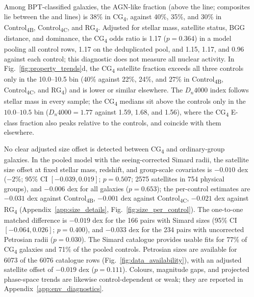\documentclass{aa}
\newcommand{\CB}{Control\textsubscript{4B}}
\newcommand{\CC}{Control\textsubscript{4C}}
\newcommand{\CG}{CG\textsubscript{4}}
\newcommand{\RG}{RG\textsubscript{4}}
\begin{document}
Among BPT-classified galaxies, the AGN-like fraction (above the \citealt{Kewley+01} line; composites lie between the \citealt{Kauffmann+03a} and \citealt{Kewley+01} lines) is 38\% in \CG{}, against 40\%, 35\%, and 30\% in \CB{}, \CC{}, and \RG{}. Adjusted for stellar mass, satellite status, BGG distance, and dominance, the \CG{} odds ratio is 1.17 (\(p = 0.364\)) in a model pooling all control rows, 1.17 on the deduplicated pool, and 1.15, 1.17, and 0.96 against each control; this diagnostic does not measure all nuclear activity. In Fig.~\ref{fig:property_trends}d, the \CG{} satellite fraction exceeds all three controls only in the 10.0--10.5 bin (40\% against 22\%, 24\%, and 27\% in \CB{}, \CC{}, and \RG{}) and is lower or similar elsewhere. The \(D_n4000\) index follows stellar mass in every sample; the \CG{} medians sit above the controls only in the \(10.0\)--\(10.5\) bin (\(D_n4000 = 1.77\) against 1.59, 1.68, and 1.56), where the \CG{} E-class fraction also peaks relative to the controls, and coincide with them elsewhere.










No clear adjusted size offset is detected between \CG{} and ordinary-group galaxies. In the pooled model with the seeing-corrected Simard radii, the satellite size offset at fixed stellar mass, redshift, and group-scale covariates is \(-0.010\) dex (\(-2\)\%; 95\% CI \([-0.039, 0.019]\); \(p = 0.507\); 2575 satellites in 754 physical groups), and \(-0.006\) dex for all galaxies (\(p = 0.653\)); the per-control estimates are \(-0.031\) dex against \CB{}, \(-0.001\) dex against \CC{}, \(-0.021\) dex against \RG{} (Appendix~\ref{app:size_details}, Fig.~\ref{fig:size_per_control}). The one-to-one matched difference is \(-0.019\) dex for the 166 pairs with Simard sizes (95\% CI \([-0.064, 0.026]\); \(p = 0.400\)), and \(-0.033\) dex for the 234 pairs with uncorrected Petrosian radii (\(p = 0.030\)). The Simard catalogue provides usable fits for 77\% of \CG{} galaxies and 71\% of the pooled controls. Petrosian sizes are available for 6073 of the 6076 catalogue rows (Fig.~\ref{fig:data_availability}), with an adjusted satellite offset of \(-0.019\) dex (\(p = 0.111\)). Colours, magnitude gaps, and projected phase-space trends are likewise control-dependent or weak; they are reported in Appendix~\ref{app:env_diagnostics}.
\end{document}
